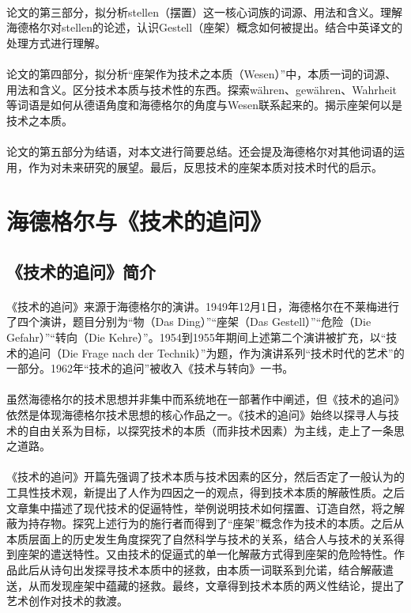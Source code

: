 \documentclass{article}
\begin{document}
        \paragraph{}
        论文的第三部分，拟分析stellen（摆置）这一核心词族的词源、用法和含义。理解海德格尔对stellen的论述，认识Gestell（座架）概念如何被提出。结合中英译文的处理方式进行理解。
        \paragraph{}
        论文的第四部分，拟分析“座架作为技术之本质（Wesen）”中，本质一词的词源、用法和含义。区分技术本质与技术性的东西。探索währen、gewähren、Wahrheit等词语是如何从德语角度和海德格尔的角度与Wesen联系起来的。揭示座架何以是技术之本质。
        \paragraph{}
        论文的第五部分为结语，对本文进行简要总结。还会提及海德格尔对其他词语的运用，作为对未来研究的展望。最后，反思技术的座架本质对技术时代的启示。
\section{海德格尔与《技术的追问》} 
	\subsection{《技术的追问》简介}
		\paragraph{}
		《技术的追问》来源于海德格尔的演讲。1949年12月1日，海德格尔在不莱梅进行了四个演讲，题目分别为“物（Das Ding）”“座架（Das Gestell）”“危险（Die Gefahr）”“转向（Die Kehre）”。1954到1955年期间上述第二个演讲被扩充，以“技术的追问（Die Frage nach der Technik）”为题，作为演讲系列“技术时代的艺术”的一部分。1962年“技术的追问”被收入《技术与转向》一书。
		\paragraph{}
		虽然海德格尔的技术思想并非集中而系统地在一部著作中阐述，但《技术的追问》依然是体现海德格尔技术思想的核心作品之一。《技术的追问》始终以探寻人与技术的自由关系为目标，以探究技术的本质（而非技术因素）为主线，走上了一条思之道路。
		\paragraph{}
		《技术的追问》开篇先强调了技术本质与技术因素的区分，然后否定了一般认为的工具性技术观，新提出了人作为四因之一的观点，得到技术本质的解蔽性质。之后文章集中描述了现代技术的促逼特性，举例说明技术如何摆置、订造自然，将之解蔽为持存物。探究上述行为的施行者而得到了“座架”概念作为技术的本质。之后从本质层面上的历史发生角度探究了自然科学与技术的关系，结合人与技术的关系得到座架的遣送特性。又由技术的促逼式的单一化解蔽方式得到座架的危险特性。作品此后从诗句出发探寻技术本质中的拯救，由本质一词联系到允诺，结合解蔽遣送，从而发现座架中蕴藏的拯救。最终，文章得到技术本质的两义性结论，提出了艺术创作对技术的救渡。
\end{document}
